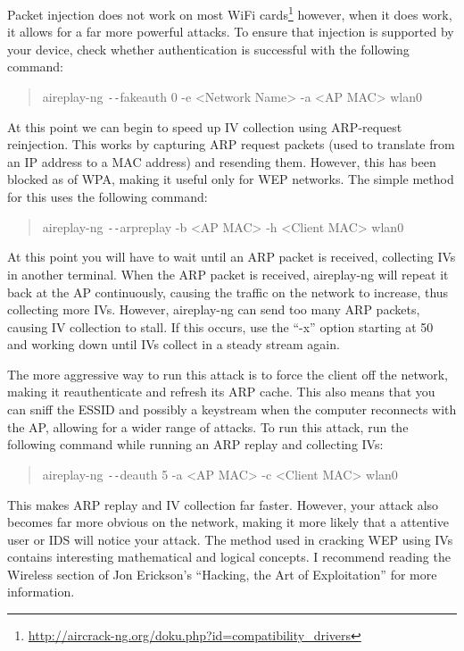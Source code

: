 \documentclass[a4paper,11pt]{report}
\begin{document}
			Packet injection does not work on most WiFi cards\footnote{\url{http://aircrack-ng.org/doku.php?id=compatibility\_drivers}}
			however, when it does work, it allows for a far more powerful attacks. 
			To ensure that injection is supported by your device, check whether authentication is successful with the following command:
			\begin{quote}
				aireplay-ng \verb+--+fakeauth 0 -e <Network Name> -a <AP MAC> wlan0
			\end{quote}

			At this point we can begin to speed up IV collection using ARP-request reinjection. 
			This works by capturing ARP request packets (used to translate from an IP address to a MAC address) and resending them. 
			However, this has been blocked as of WPA, making it useful only for WEP networks.
			The simple method for this uses the following command:
			\begin{quote}
				aireplay-ng \verb+--+arpreplay -b <AP MAC> -h <Client MAC> wlan0
			\end{quote}
			At this point you will have to wait until an ARP packet is received, collecting IVs in another terminal. 
			When the ARP packet is received, aireplay-ng will repeat it back at the AP continuously, causing the traffic on the network to increase, thus collecting more IVs. 
			However, aireplay-ng can send too many ARP packets, causing IV collection to stall. 
			If this occurs, use the ``-x'' option starting at 50 and working down until IVs collect in a steady stream again. 

			The more aggressive way to run this attack is to force the client off the network, making it reauthenticate and refresh its ARP cache. 
			This also means that you can sniff the ESSID and possibly a keystream when the computer reconnects with the AP, allowing for a wider range of attacks. 
			To run this attack, run the following command while running an ARP replay and collecting IVs:
			\begin{quote}
				aireplay-ng \verb+--+deauth 5 -a <AP MAC> -c <Client MAC> wlan0
			\end{quote}
			This makes ARP replay and IV collection far faster.
			However, your attack also becomes far more obvious on the network, making it more likely that a attentive user or IDS will notice your attack. 
			The method used in cracking WEP using IVs contains interesting mathematical and logical concepts. 
			I recommend reading the Wireless section of Jon Erickson's ``Hacking, the Art of Exploitation''\cite{HackingAOE} for more information.
			
\end{document}

